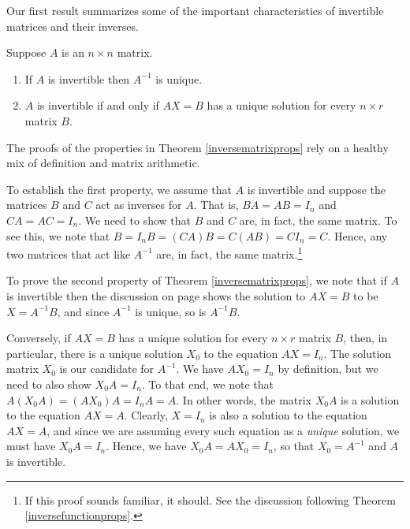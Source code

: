\documentclass{ximera}
\begin{document}
Our first result summarizes some of the important characteristics of invertible matrices and their inverses.  

\smallskip


\begin{theorem}  \label{inversematrixprops}  Suppose $A$ is an $n \times n$ matrix. 


\vspace{-.1in} 

\begin{enumerate}

\item  If $A$ is invertible then $A^{-1}$ is unique.

\vspace{-.1in}

\item  $A$ is invertible if and only if $AX = B$ has a unique solution for every $n \times r$ matrix $B$.  

\end{enumerate}

\end{theorem}


\smallskip

The proofs of the properties in Theorem \ref{inversematrixprops} rely on a healthy mix of definition and matrix arithmetic.  

To establish the first property, we assume that $A$ is invertible and suppose the matrices $B$ and $C$ act as inverses for $A$.  That is, $BA = AB = I_{n}$ and $CA = AC = I_{n}$.  We need to show that $B$ and $C$ are, in fact, the same matrix.  To see this, we note that $B = I_{n}B = (CA)B = C(AB) = CI_{n} = C$. Hence, any two matrices that act like $A^{-1}$ are, in fact, the same matrix.\footnote{If this proof sounds familiar, it should. See the discussion following Theorem \ref{inversefunctionprops}.}  

To prove the second property of Theorem  \ref{inversematrixprops}, we note that if $A$ is invertible then the discussion on page \pageref{solvingmatrixeqn} shows the solution to $AX=B$ to be $X = A^{-1}B$, and since $A^{-1}$ is unique, so is $A^{-1}B$. 

Conversely, if $AX = B$ has a unique solution for every $n \times r$ matrix $B$, then, in particular, there is a unique solution $X_{0}$ to the equation $AX = I_{n}$.  The solution matrix $X_{0}$ is our candidate for $A^{-1}$. We have $AX_{0} = I_{n}$ by definition, but we need to also show $X_{0}A = I_{n}$.  To that end, we note that $A\left(X_{0}A\right) = \left(AX_{0}\right)A = I_{n}A = A$.  In other words, the matrix $X_{0}A$ is a solution to the equation $AX = A$.  Clearly, $X=I_{n}$ is also a solution to the equation $AX = A$, and since we are assuming every such equation as a \textit{unique} solution, we must have $X_{0}A = I_{n}$.  Hence, we have $X_{0}A = AX_{0} = I_{n}$, so that $X_{0} = A^{-1}$ and $A$ is invertible.  
\end{document}
